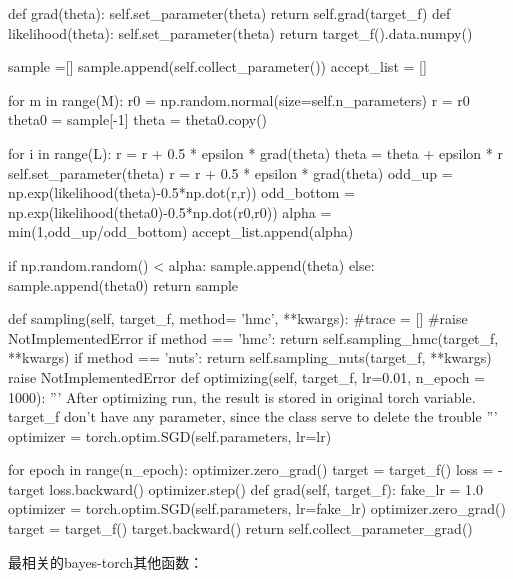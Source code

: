 \documentclass{article}
\begin{document}
\begin{python}
        def grad(theta):
            self.set_parameter(theta)
            return self.grad(target_f)
        def likelihood(theta):
            self.set_parameter(theta)
            return target_f().data.numpy()
        
        sample =[]
        sample.append(self.collect_parameter())
        accept_list = []
        
        for m in range(M):
            r0 = np.random.normal(size=self.n_parameters)
            r = r0
            theta0 = sample[-1]
            theta = theta0.copy()
            
            for i in range(L):
                r = r + 0.5 * epsilon * grad(theta)
                theta = theta + epsilon * r
                self.set_parameter(theta)
                r = r + 0.5 * epsilon * grad(theta)
            odd_up = np.exp(likelihood(theta)-0.5*np.dot(r,r))
            odd_bottom = np.exp(likelihood(theta0)-0.5*np.dot(r0,r0))
            alpha = min(1,odd_up/odd_bottom)
            accept_list.append(alpha)
            
            if np.random.random() < alpha:
                sample.append(theta)
            else:
                sample.append(theta0)
        return sample
        

    def sampling(self, target_f, method= 'hmc', **kwargs):
        #trace = []
        #raise NotImplementedError
        if method == 'hmc':
            return self.sampling_hmc(target_f, **kwargs)
        if method == 'nuts':
            return self.sampling_nuts(target_f, **kwargs)
        raise NotImplementedError
    def optimizing(self, target_f, lr=0.01, n_epoch = 1000):
        '''
        After optimizing run, the result is stored in original torch variable.
        target_f don't have any parameter, since the class serve to delete the trouble
        '''
        optimizer = torch.optim.SGD(self.parameters, lr=lr)
        
        for epoch in range(n_epoch):
            optimizer.zero_grad()
            target = target_f()
            loss = -target
            loss.backward()
            optimizer.step()
    def grad(self, target_f):
        fake_lr = 1.0
        optimizer = torch.optim.SGD(self.parameters, lr=fake_lr)
        optimizer.zero_grad()
        target = target_f()
        target.backward()
        return self.collect_parameter_grad()

\end{python}


最相关的bayes-torch其他函数：
\end{document}
